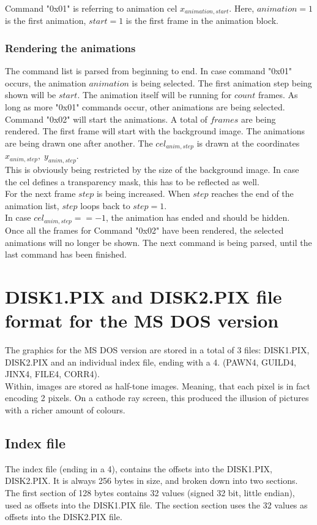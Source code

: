 \documentclass[11pt,twoside,openright]{report}
\begin{document}
Command "0x01" is referring to animation cel $x_{animation,start}$. Here, $animation=1$ is the first animation, $start=1$ is the first frame in the animation block.\\

\subsubsection{Rendering the animations}
The command list is parsed from beginning to end. In case command "0x01" occurs, the animation $animation$ is being selected. The first animation step being shown will be $start$. The animation itself will be running for $count$ frames. As long as more "0x01" commands occur, other animations are being selected.\\
Command "0x02" will start the animations. A total of $frames$ are being rendered. The first frame will start with the background image. The animations are being drawn one after another. The $cel_{anim,step}$ is drawn at the coordinates $x_{anim,step},\;y_{anim,step}$.\\
This is obviously being restricted by the size of the background image. In case the cel defines a transparency mask, this has to be reflected as well. \\
For the next frame $step$ is being increased. When $step$ reaches the end of the animation list, $step$ loops back to $step=1$.\\
In case $cel_{anim,step}==-1$, the animation has ended and should be hidden.\\

Once all the frames for Command "0x02" have been rendered, the selected animations will no longer be shown. The next command is being parsed, until the last command has been finished.\\

\section{DISK1.PIX and DISK2.PIX file format for the MS DOS version}
The graphics for the MS DOS version are stored in a total of 3 files: DISK1.PIX, DISK2.PIX and an individual index file, ending with a 4. (PAWN4, GUILD4, JINX4, FILE4, CORR4).\\
Within, images are stored as half-tone images. Meaning, that each pixel is in fact encoding 2 pixels. On a cathode ray screen, this produced the illusion of pictures with a richer amount of colours.
\subsection{Index file}
The index file (ending in a 4), contains the offsets into the DISK1.PIX, DISK2.PIX. It is always 256 bytes in size, and broken down into two sections. The first section of 128 bytes contains 32 values (signed 32 bit, little endian), used as offsets into the DISK1.PIX file. The section section uses the 32 values as offsets into the DISK2.PIX file.\\
\end{document}
